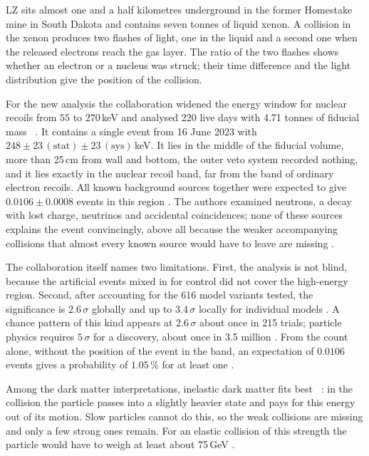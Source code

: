 LZ sits almost one and a half kilometres underground in the former Homestake mine in South Dakota
and contains seven tonnes of liquid xenon. A collision in the xenon produces two flashes of light,
one in the liquid and a second one when the released electrons reach the gas layer. The ratio of the
two flashes shows whether an electron or a nucleus was struck; their time difference and the light
distribution give the position of the collision.

For the new analysis the collaboration widened the energy window for nuclear recoils from $55$ to
$270$\,keV and analysed 220 live days with 4.71 tonnes of fiducial mass \QM~\cite{LZ2026}. It
contains a single event from 16 June 2023 with $248\pm23\,(\text{stat})\pm23\,(\text{sys})$\,keV. It
lies in the middle of the fiducial volume, more than 25\,cm from wall and bottom, the outer veto
system recorded nothing, and it lies exactly in the nuclear recoil band, far from the band of
ordinary electron recoils. All known background sources together were expected to give
$0.0106\pm0.0008$ events in this region \QM. The authors examined neutrons, a decay with lost charge,
neutrinos and accidental coincidences; none of these sources explains the event convincingly, above
all because the weaker accompanying collisions that almost every known source would have to leave
are missing \QM.

The collaboration itself names two limitations. First, the analysis is not blind, because the
artificial events mixed in for control did not cover the high-energy region. Second, after
accounting for the 616 model variants tested, the significance is $2.6\,\sigma$ globally and up to
$3.4\,\sigma$ locally for individual models \QM. A chance pattern of this kind appears at
$2.6\,\sigma$ about once in 215 trials; particle physics requires $5\,\sigma$ for a discovery, about
once in 3.5 million \KM. From the count alone, without the position of the event in the band, an
expectation of $0.0106$ events gives a probability of $1.05\,\%$ for at least one \KM.

Among the dark matter interpretations, inelastic dark matter fits best
\QM~\cite{TuckerSmithWeiner2001}: in the collision the particle passes into a slightly heavier state
and pays for this energy out of its motion. Slow particles cannot do this, so the weak collisions are
missing and only a few strong ones remain. For an elastic collision of this strength the particle
would have to weigh at least about 75\,GeV \KM.


